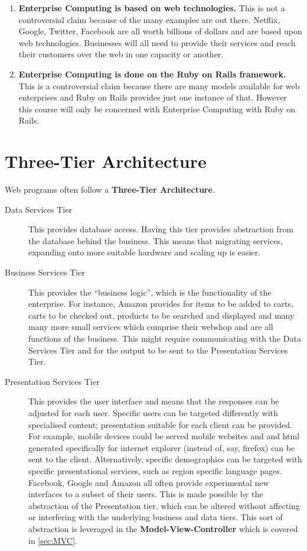 \documentclass[11pt]{article}
\begin{document}
\begin{enumerate}
\item \textbf{Enterprise Computing is based on web technologies.} This is not a controversial claim because of the many examples are out there. Netflix, Google, Twitter, Facebook are all worth billions of dollars and are based upon web technologies. Businesses will all need to provide their services and reach their customers over the web in one capacity or another.
\item \textbf{Enterprise Computing is done on the Ruby on Rails framework.} This is a controversial claim because there are many models available for web enterprises and Ruby on Rails provides just one instance of that. However this course will only be concerned with Enterprise Computing with Ruby on Rails.
\end{enumerate}


\section{Three-Tier Architecture}
\label{sec:tier}

Web programs often follow a \textbf{Three-Tier Architecture}.
\begin{description}
\item[Data Services Tier]
This provides database access. Having this tier provides abstraction from the database behind the business. This means that migrating services, expanding onto more suitable hardware and scaling up is easier.
\item[Business Services Tier]
This provides the ``business logic'', which is the functionality of the enterprise. For instance, Amazon provides for items to be added to carts, carts to be checked out, products to be searched and displayed and many many more small services which comprise their webshop and are all functions of the business. This might require communicating with the Data Services Tier and for the output to be sent to the Presentation Services Tier.
\item[Presentation Services Tier]
This provides the user interface and means that the responses can be adjusted for each user. Specific users can be targeted differently with specialised content; presentation suitable for each client can be provided. For example, mobile devices could be served mobile websites and and html generated specifically for internet explorer (instead of, say, firefox) can be sent to the client. Alternatively, specific demographics can be targeted with specific presentational services, such as region specific language pages. Facebook, Google and Amazon all often provide experimental new interfaces to a subset of their users. This is made possible by the abstraction of the Presentation tier, which can be altered without affecting or interfering with the underlying business and data tiers. This sort of abstraction is leveraged in the \textbf{Model-View-Controller} which is covered in \ref{sec:MVC}.   %
\end{description}
\end{document}
